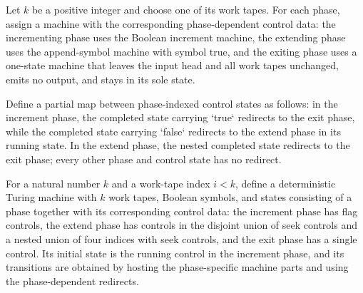 \begin{definition}
\label{Turing.rt_succParts}
\leanok
{}
Let $k$ be a positive integer and choose one of its work tapes. For each phase, assign a
machine with the corresponding phase-dependent control data: the incrementing phase uses
the Boolean increment machine, the extending phase uses the append-symbol machine with
symbol true, and the exiting phase uses a one-state machine that leaves the input head
and all work tapes unchanged, emits no output, and stays in its sole state.
\end{definition}

\begin{definition}
\label{Turing.rt_succRedirect}
\leanok
{}
Define a partial map between phase-indexed control states as follows: in the increment
phase, the completed state carrying `true` redirects to the exit phase, while the
completed state carrying `false` redirects to the extend phase in its running state. In
the extend phase, the nested completed state redirects to the exit phase; every other
phase and control state has no redirect.
\end{definition}

\begin{definition}
\label{Turing.rt_succTM}
\leanok
{}
For a natural number $k$ and a work-tape index $i<k$, define a deterministic Turing
machine with $k$ work tapes, Boolean symbols, and states consisting of a phase together
with its corresponding control data: the increment phase has flag controls, the extend
phase has controls in the disjoint union of seek controls and a nested union of four
indices with seek controls, and the exit phase has a single control. Its initial state
is the running control in the increment phase, and its transitions are obtained by
hosting the phase-specific machine parts and using the phase-dependent redirects.
\end{definition}

